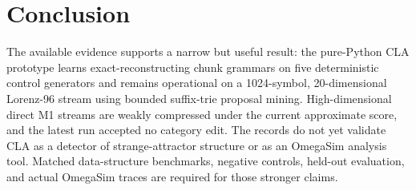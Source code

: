 \documentclass[11pt]{article}
\begin{document}
\section{Conclusion}

The available evidence supports a narrow but useful result: the pure-Python CLA
prototype learns exact-reconstructing chunk grammars on five deterministic
control generators and remains operational on a 1024-symbol, 20-dimensional
Lorenz-96 stream using bounded suffix-trie proposal mining. High-dimensional
direct M1 streams are weakly compressed under the current approximate score,
and the latest run accepted no category edit. The records do not yet validate
CLA as a detector of strange-attractor structure or as an OmegaSim analysis
tool. Matched data-structure benchmarks, negative controls, held-out evaluation,
and actual OmegaSim traces are required for those stronger claims.
\end{document}
